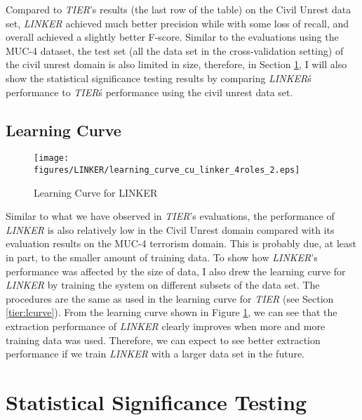 Compared to {\it TIER}'s results (the last row of the table) on the Civil Unrest data set, 
{\it LINKER} achieved much better precision while with some loss of recall, and overall 
achieved a slightly better F-score.
Similar to the evaluations using the MUC-4 dataset, 
the test set (all the data set in the cross-validation setting) 
of the civil unrest domain is also limited in size,  
therefore, in Section \ref{linker:significance}, I will also show the statistical significance testing results 
by comparing {\it LINKER}\'s performance to {\it TIER}\'s 
performance using the civil unrest data set.



\subsection{Learning Curve}
\begin{figure}[h]
 \centering
 \texttt{[image: figures/LINKER/learning\_curve\_cu\_linker\_4roles\_2.eps]}
 \caption{Learning Curve for LINKER}
\label{learning_curve_cu_linker}
\end{figure} 

Similar to what we have observed in {\it TIER}'s evaluations, 
the performance of {\it LINKER} is also relatively low in the Civil Unrest domain  
compared with its evaluation results on the MUC-4 terrorism domain.
This is probably due, at least in part, to the 
smaller amount of training data. 
To show how {\it LINKER}'s performance was affected by the size of data, 
I also drew the learning curve for {\it LINKER}
by training the system on different subsets of the data set.
The procedures are the same as used in the learning curve 
for {\it TIER} (see Section \ref{tier:lcurve}).
From the learning curve shown in Figure \ref{learning_curve_cu_linker}, 
we can see that the extraction performance of {\it LINKER} clearly improves 
when more and more training data was used. 
Therefore, we can expect to see better extraction performance 
if we train {\it LINKER} with a larger data set in the future. 


\section{Statistical Significance Testing}
\label{linker:significance}


